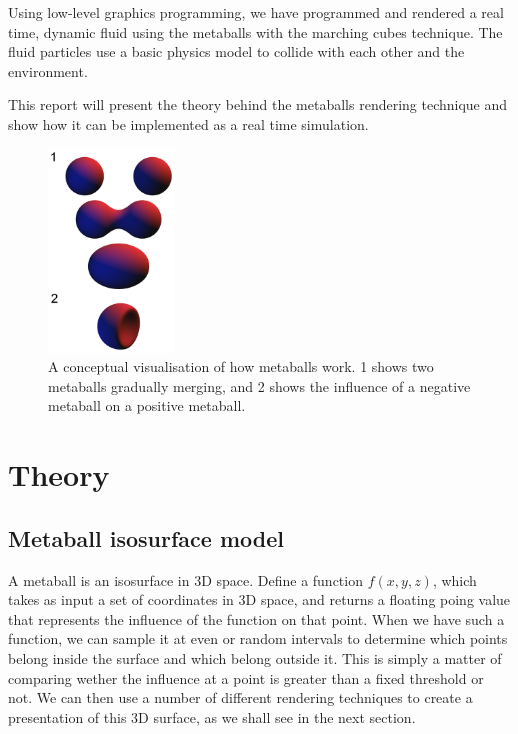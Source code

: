 \documentclass{article}
\begin{document}
\begin{multicols}{2}
	Using low-level graphics programming, we have programmed and rendered a real time, dynamic fluid using the metaballs with the marching cubes technique. The fluid particles use a basic physics model to collide with each other and the environment.

    This report will present the theory behind the metaballs rendering technique and show how it can be implemented as a real time simulation.
    
    \begin{figure}[H]
    	\centering
    	\begin{minipage}[b]{0.5\textwidth}
    		\centering
    		\includegraphics[width=0.3\textwidth]{img/metaballs-concept.png}
    		\caption{A conceptual visualisation of how metaballs work. 1 shows two metaballs gradually merging, and 2 shows the influence of a negative metaball on a positive metaball. \cite{wiki07}}
    		\label{fig:metaballs-concept}
    	\end{minipage}
    \end{figure}

    \section{Theory}

        \subsection{Metaball isosurface model}
            A metaball is an isosurface in 3D space. 
            Define a function $f(x,y,z)$, which takes as input a set of coordinates in 3D space, and returns a floating poing value that represents the influence of the function on that point.
            When we have such a function, we can sample it at even or random intervals to determine which points belong inside the surface and which belong outside it.
            This is simply a matter of comparing wether the influence at a point is greater than a fixed threshold or not.
            We can then use a number of different rendering techniques to create a presentation of this 3D surface, as we shall see in the next section.


\end{multicols}
\end{document}
